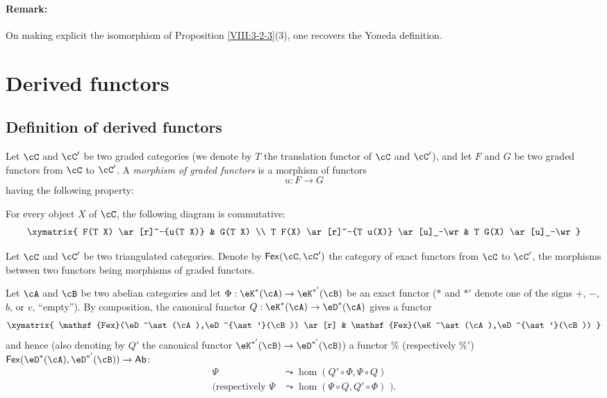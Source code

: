\paragraph{Remark:}
On making explicit the isomorphism of Proposition
\ref{VIII:3-2-3}(3), one recovers the Yoneda definition.

\section{Derived functors}\label{VIII:4}

\subsection{Definition of derived functors}\label{VIII:4-1}

\begin{definition}\label{VIII:4-1-1}
Let $\cC$ and $\cC'$ be two graded categories (we denote by $T$ the
translation functor of $\cC$ and $\cC'$), and let $F$ and $G$ be two
graded functors from $\cC$ to $\cC'$. A \emph{morphism of graded functors}
is a morphism of functors
\[
  u:F\to G
\]
having the following property:

For every object $X$ of $\cC$, the following diagram is commutative:
\[\xymatrix{
  F(T X) \ar[r]^-{u(T X)}
    & G(T X) \\
  T F(X) \ar[r]^-{T u(X)} \ar[u]_-\wr
    & T G(X) \ar[u]_-\wr
}\]
\end{definition}

Let $\cC$ and $\cC'$ be two triangulated categories. Denote by
$\mathsf{Fex}(\cC,\cC')$ the category of exact functors from $\cC$ to
$\cC'$, the morphisms between two functors being morphisms of graded
functors.

Let $\cA$ and $\cB$ be two abelian categories and let
$\Phi:\eK^\ast(\cA)\to \eK^{\ast'}(\cB)$ be an exact functor ($\ast$ and
$\ast'$ denote one of the signs $+$, $-$, $b$, or $v$, “empty”). By
composition, the canonical functor
$Q:\eK^\ast(\cA)\to \eD^\ast(\cA)$ gives a functor
\[\xymatrix{
  \mathsf{Fex}(\eD^\ast(\cA),\eD^{\ast'}(\cB)) \ar[r]
    & \mathsf{Fex}(\eK^\ast(\cA),\eD^{\ast'}(\cB))
}\]
and hence (also denoting by $Q'$ the canonical functor
$\eK^{\ast'}(\cB) \to \eD^{\ast'}(\cB)$) a functor $\%$
(respectively $\%'$)
$\mathsf{Fex}(\eD^\ast(\cA),\eD^{\ast'}(\cB)) \to \mathsf{Ab}$:
\begin{align*}
  \Psi  &\leadsto \hom(Q'\circ \Phi,\Psi\circ Q) \\
  (\text{respectively }\Psi &\leadsto \hom(\Psi\circ Q,Q'\circ \Phi)\text{ ).}
\end{align*}

